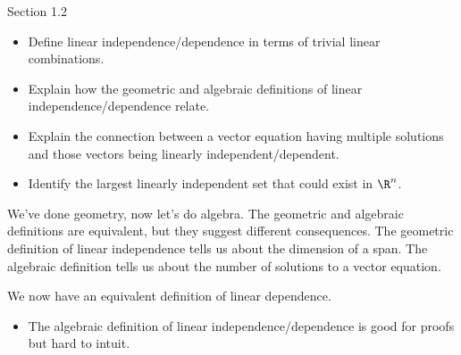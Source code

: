 \documentclass{problemset}
\newcommand{\bookonlynewpage}{\begin{bookonly}\newpage\end{bookonly}}
\begin{document}
\begin{lesson}

	Section 1.2

	\begin{itemize}
		\item Define linear independence/dependence in terms of trivial linear combinations.
		\item Explain how the geometric and algebraic definitions of linear independence/dependence relate.
		\item Explain the connection between a vector equation having multiple
			solutions and those vectors being linearly independent/dependent.
		\item Identify the largest linearly independent set that could exist in $\R^n$.
	\end{itemize}

	We've done geometry, now let's do algebra. The geometric and algebraic definitions
	are equivalent, but they suggest different consequences. The geometric definition
	of linear independence tells us about the dimension of a span. The algebraic
	definition tells us about the number of solutions to a vector equation.

\end{lesson}

	We now have an equivalent definition of linear dependence.
	\begin{annotation}
		\begin{notes}
			\begin{itemize}
				\item The algebraic definition of linear independence/dependence
					is good for proofs but hard to intuit.
			\end{itemize}
		\end{notes}
	\end{annotation}

	\bookonlynewpage
\end{document}
